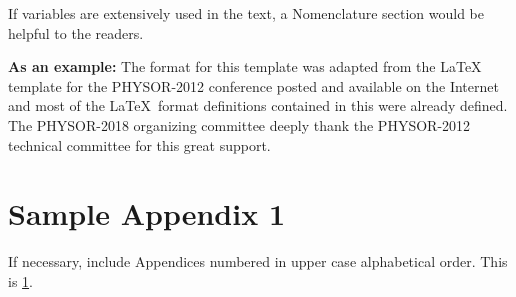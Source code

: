 \documentclass[letterpaper]{physor2018}
\begin{document}
If variables are extensively used in the text, a Nomenclature section would be helpful to the readers.


\textbf{As an example:} The format for this template was adapted from the \LaTeX
template for the PHYSOR-2012 conference posted and available on the Internet and
most of the \LaTeX\ format definitions contained in this were already defined. The
PHYSOR-2018 organizing committee deeply thank the PHYSOR-2012 technical committee
for this great support.

\setlength{\baselineskip}{12pt}



\appendix
\gdef\thesection{APPENDIX \Alph{section}}
\section{Sample Appendix 1}
\label{app:a}
If necessary, include Appendices numbered in upper case alphabetical order. This is \ref{app:a}.
\end{document}
